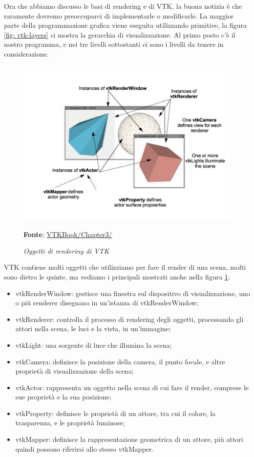 Ora che abbiamo discusso le basi di rendering e di VTK, la buona notizia è che raramente dovremo preoccuparci di implementarle o modificarle. La maggior parte della programmazione grafica viene eseguita utilizzando primitive, la figura \ref{fig: vtk-layers} ci mostra la gerarchia di visualizzazione. Al primo posto c'è il nostro programma, e nei tre livelli sottostanti ci sono i livelli da tenere in considerazione.

\begin{figure}[h]
    \centering
    \includegraphics[scale=0.5]{immagini/volumerendering/vtkobjects.png}
    \caption{\textit{Oggetti di rendering di VTK}}
    \textbf{Fonte}: \href{https://lorensen.github.io/VTKExamples/site/VTKBook/03Chapter3/}{VTKBook/Chapter3/}
    \label{fig: Oggetti Rendering VTK}
\end{figure}

VTK contiene molti oggetti che utilizziamo per fare il render di una scena, molti sono dietro le quinte, ma vediamo i principali mostrati anche nella figura \ref{fig: Oggetti Rendering VTK}:
\begin{itemize}
\item vtkRenderWindow: gestisce una finestra sul dispositivo di visualizzazione, uno o più renderer disegnano in un'istanza di vtkRenderWindow;
\item vtkRenderer: controlla il processo di rendering degli oggetti, processando gli attori nella scena, le luci e la vista, in un'immagine;
\item vtkLight: una sorgente di luce che illumina la scena;
\item vtkCamera: definisce la posizione della camera, il punto focale, e altre proprietà di visualizzazione della scena;
\item vtkActor: rappresenta un oggetto nella scena di cui fare il render, comprese le sue proprietà e la sua posizione;
\item vtkProperty: definisce le proprietà di un attore, tra cui il colore, la trasparenza, e le proprietà luminose;  
\item vtkMapper: definisce la rappresentazione geometrica di un attore, più attori quindi possono riferirsi allo stesso vtkMapper.
\end{itemize}

